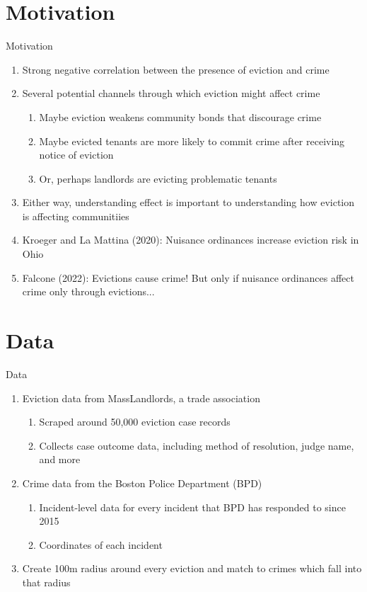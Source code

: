 \documentclass [xcolor=svgnames, t] {beamer}
\begin{document}
\section{Motivation}


\begin{frame}{Motivation}
\begin{enumerate}
    \item Strong negative correlation between the presence of eviction and crime
    \item Several potential channels through which eviction might affect crime
    \begin{enumerate}
        \item Maybe eviction weakens community bonds that discourage crime
        \item Maybe evicted tenants are more likely to commit crime after receiving notice of eviction
        \item Or, perhaps landlords are evicting problematic tenants
    \end{enumerate}
    \item Either way, understanding effect is important to understanding how eviction is affecting communitiies
    \item Kroeger and La Mattina (2020): Nuisance ordinances increase eviction risk in Ohio
    \item Falcone (2022): Evictions cause crime! But only if nuisance ordinances affect crime only through evictions...
\end{enumerate}
\end{frame}

\section{Data}
\begin{frame}{Data}
    \begin{enumerate}
        \item Eviction data from MassLandlords, a trade association
        \begin{enumerate}
            \item Scraped around 50,000 eviction case records
            \item Collects case outcome data, including method of resolution, judge name, and more
        \end{enumerate}
        \item Crime data from the Boston Police Department (BPD)
        \begin{enumerate}
            \item Incident-level data for every incident that BPD has responded to since 2015
            \item Coordinates of each incident
        \end{enumerate}
        \item Create 100m radius around every eviction and match to crimes which fall into that radius
    \end{enumerate}
\end{frame}
\end{document}

